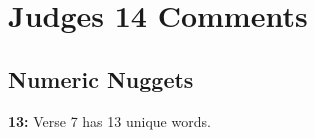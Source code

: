 \section{Judges 14 Comments}

\subsection{Numeric Nuggets}
\textbf{13: } Verse 7 has 13 unique words.

